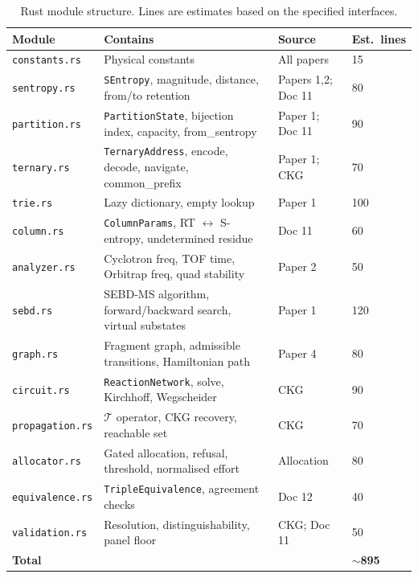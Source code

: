 \documentclass[11pt,a4paper]{article}
\theoremstyle{planstyle}
\theoremstyle{definition}
\theoremstyle{remark}
\newcommand{\Tmap}{\mathcal{T}}
\newcommand{\shk}[1]{\texttt{#1}}
\begin{document}
\begin{table}[htbp]
\centering
\small
\caption{Rust module structure. Lines are estimates based on the
specified interfaces.}
\label{tab:rust-modules}
\begin{tabular}{@{}llll@{}}
\toprule
\textbf{Module} & \textbf{Contains} & \textbf{Source} & \textbf{Est.\ lines} \\
\midrule
\shk{constants.rs}     & Physical constants              & All papers   & 15 \\
\shk{sentropy.rs}      & \shk{SEntropy}, magnitude, distance,
                         from/to retention                & Papers 1,2; Doc 11 & 80 \\
\shk{partition.rs}     & \shk{PartitionState}, bijection index,
                         capacity, from\_sentropy         & Paper 1; Doc 11 & 90 \\
\shk{ternary.rs}       & \shk{TernaryAddress}, encode, decode,
                         navigate, common\_prefix         & Paper 1; CKG & 70 \\
\shk{trie.rs}          & Lazy dictionary, empty lookup    & Paper 1      & 100 \\
\shk{column.rs}        & \shk{ColumnParams}, RT $\leftrightarrow$
                         S-entropy, undetermined residue  & Doc 11       & 60 \\
\shk{analyzer.rs}      & Cyclotron freq, TOF time,
                         Orbitrap freq, quad stability    & Paper 2      & 50 \\
\shk{sebd.rs}          & SEBD-MS algorithm, forward/backward
                         search, virtual substates        & Paper 1      & 120 \\
\shk{graph.rs}         & Fragment graph, admissible transitions,
                         Hamiltonian path                 & Paper 4      & 80 \\
\shk{circuit.rs}       & \shk{ReactionNetwork}, solve,
                         Kirchhoff, Wegscheider           & CKG          & 90 \\
\shk{propagation.rs}   & $\Tmap$ operator, CKG recovery,
                         reachable set                    & CKG          & 70 \\
\shk{allocator.rs}     & Gated allocation, refusal,
                         threshold, normalised effort     & Allocation   & 80 \\
\shk{equivalence.rs}   & \shk{TripleEquivalence},
                         agreement checks                 & Doc 12       & 40 \\
\shk{validation.rs}    & Resolution, distinguishability,
                         panel floor                      & CKG; Doc 11  & 50 \\
\midrule
\textbf{Total}         &                                  &              & $\sim$\textbf{895} \\
\bottomrule
\end{tabular}
\end{table}
\end{document}
